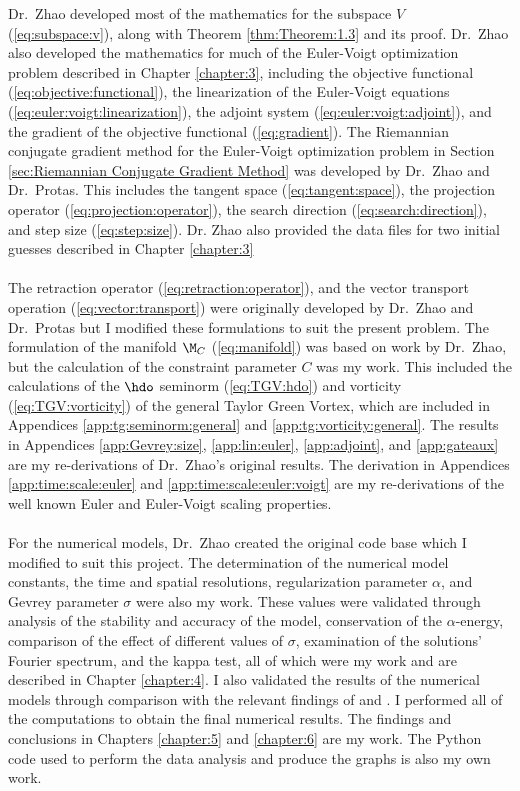 
Dr.~Zhao developed most of the mathematics for the subspace $V$ (\ref{eq:subspace:v}), along with Theorem \ref{thm:Theorem:1.3} and its proof. Dr.~Zhao also developed the mathematics for much of the Euler-Voigt optimization problem described in Chapter \ref{chapter:3}, including the objective functional (\ref{eq:objective:functional}), the linearization of the Euler-Voigt equations (\ref{eq:euler:voigt:linearization}), the adjoint system (\ref{eq:euler:voigt:adjoint}), and the gradient of the objective functional (\ref{eq:gradient}). The Riemannian conjugate gradient method for the Euler-Voigt optimization problem in Section \ref{sec:Riemannian Conjugate Gradient Method} was developed by Dr.~Zhao and Dr.~Protas. This includes the tangent space (\ref{eq:tangent:space}), the projection operator (\ref{eq:projection:operator}), the search direction (\ref{eq:search:direction}), and step size (\ref{eq:step:size}). {\color{red} Dr. Zhao also provided the data files for two initial guesses described in Chapter \ref{chapter:3}}
\\~\\
The retraction operator (\ref{eq:retraction:operator}), and the vector transport operation (\ref{eq:vector:transport}) were originally developed by Dr.~Zhao and Dr.~Protas but I modified these formulations to suit the present problem. The formulation of the manifold $\M_C$ (\ref{eq:manifold}) was based on work by Dr.~Zhao, but the calculation of the constraint parameter $C$ was my work. This included the calculations of the $\hdo$ seminorm (\ref{eq:TGV:hdo}) and vorticity (\ref{eq:TGV:vorticity}) of the general Taylor Green Vortex, which are included in Appendices \ref{app:tg:seminorm:general} and \ref{app:tg:vorticity:general}. The results in Appendices \ref{app:Gevrey:size}, \ref{app:lin:euler}, \ref{app:adjoint}, and \ref{app:gateaux} are my re-derivations of Dr.~Zhao's original results. The derivation in Appendices \ref{app:time:scale:euler} and \ref{app:time:scale:euler:voigt} are my re-derivations of the well known Euler and Euler-Voigt scaling properties.
\\~\\
For the numerical models, Dr.~Zhao created the original code base which I modified to suit this project. The determination of the numerical model constants, the time and spatial resolutions, regularization parameter $\alpha$, and Gevrey parameter $\sigma$ were also my work. These values were validated through analysis of the stability and accuracy of the model, conservation of the $\alpha$-energy, comparison of the effect of different values of $\sigma$, examination of the solutions' Fourier spectrum, and the kappa test, all of which were my work and are described in Chapter \ref{chapter:4}. I also validated the results of the numerical models through comparison with the relevant findings of \cite{bustamante_interplay_2012} and \cite{larios_computational_2018}. I performed all of the computations to obtain the final numerical results. The findings and conclusions in Chapters \ref{chapter:5} and \ref{chapter:6} are my work. The Python code used to perform the data analysis and produce the graphs is also my own work.